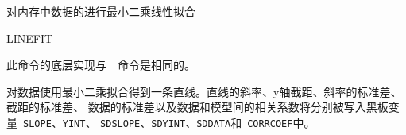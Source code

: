 \label{cmd:linefit}

对内存中数据的进行最小二乘线性拟合

\begin{SACSTX}
LINEFIT
\end{SACSTX}

此命令的底层实现与~~命令是相同的。

对数据使用最小二乘拟合得到一条直线。直线的斜率、y轴截距、斜率的标准差、截距的标准差、
数据的标准差以及数据和模型间的相关系数将分别被写入黑板变量~\verb+SLOPE+、\verb+YINT+、
\verb+SDSLOPE+、\verb+SDYINT+、\verb+SDDATA+和~\verb+CORRCOEF+中。
